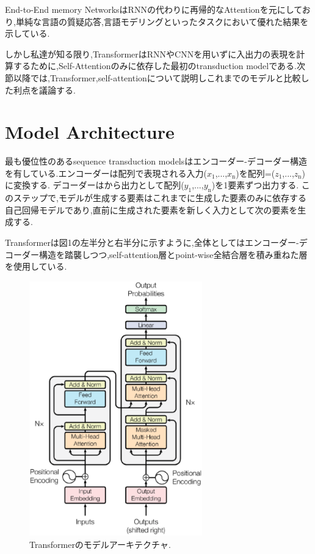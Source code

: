 \documentclass[twocolumn]{jarticle}     %
\begin{document}
End-to-End memory NetworksはRNNの代わりに再帰的なAttentionを元にしており,単純な言語の質疑応答,言語モデリングといったタスクにおいて優れた結果を示している.\par

しかし私達が知る限り,TransformerはRNNやCNNを用いずに入出力の表現を計算するために,Self-Attentionのみに依存した最初のtransduction modelである.次節以降では,Transformer,self-attentionについて説明しこれまでのモデルと比較した利点を議論する.




\section{Model Architecture}
最も優位性のあるsequence transduction modelsはエンコーダー-デコーダー構造を有している.エンコーダーは配列で表現される入力($x_\mathrm{1}$,...,$x_\mathrm{n}$)を配列=($z_\mathrm{1}$,...,$z_\mathrm{n}$)に変換する.
デコーダーはから出力として配列($y_\mathrm{1}$,...,$y_\mathrm{n}$)を1要素ずつ出力する.
このステップで,モデルが生成する要素はこれまでに生成した要素のみに依存する自己回帰モデルであり,直前に生成された要素を新しく入力として次の要素を生成する.\par
Transformerは図1の左半分と右半分に示すように,全体としてはエンコーダー-デコーダー構造を踏襲しつつ,self-attention層とpoint-wise全結合層を積み重ねた層を使用している.

\begin{figure}[ht]
  \centering
  \includegraphics[width=75mm]{assets/Figure1.eps}
  \caption{Transformerのモデルアーキテクチャ.}
  \label{Figure1}
\end{figure}
\end{document}
